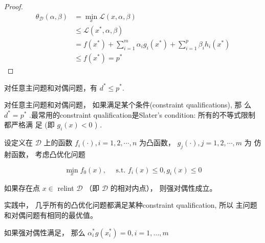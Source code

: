 \begin{proof}
    \begin{equation} \begin{aligned} \theta_{\mathcal{D}}(\alpha, \beta) &=\min _{x} \mathcal{L}(x, \alpha, \beta) \\ & \leqslant \mathcal{L}\left(x^{*}, \alpha, \beta\right) \\ &=f\left(x^{*}\right)+\sum_{i=1}^{m} \alpha_{i} g_{i}\left(x^{*}\right)+\sum_{i=1}^{p} \beta_{i} h_{i}\left(x^{*}\right) \\ & \leqslant f\left(x^{*}\right)=p^{*} \end{aligned} \end{equation}
\end{proof}

\begin{theorem}[弱对偶性]
    对任意主问题和对偶问题，有 $ d^{*} \leqslant p^{*} $.
\end{theorem}

\begin{theorem}[强对偶性]
    对任意主问题和对偶问题， 如果满足某个条件(constraint qualifications), 那 么 $ d^{*}=p^{*} $ .最常用的constraint qualification是Slater's condition: 所有的不等式限制都严格满 足 (即 $ g_{i}(x)<0 $ ) .
\end{theorem}

\begin{theorem}[Slater 条件]
    设定义在 $ \mathcal{D} $ 上的函数 $ f_{i}(\cdot), i=1,2, \cdots, n $ 为凸函数， $ g_{j}(\cdot), j=1,2, \cdots, m $ 为 仿射函数， 考虑凸优化问题

    \begin{equation}
    \min _{{x}} f_{0}({x}), \quad \text { s.t. } f_{i}({x}) \leq 0, g_{i}({x}) \leq 0
    \end{equation}

    如果存在点 $ {x} \in $ relint $ \mathcal{D} $ （即 $ \mathcal{D} $ 的相对内点）， 则强对偶性成立。
\end{theorem}

实践中， 几乎所有的凸优化问题都满足某种constraint qualification, 所以 主问题和对偶问题有相同的最优值。

\begin{theorem}
    如果强对偶性满足， 那么 $ \alpha_{i}^{*} g\left(x_{i}^{*}\right)=0, i=1, \ldots, m $
    
\end{theorem}

